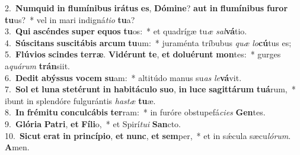 {2.~}\textbf{Num}\textbf{quid} \textbf{in} \textbf{flu}\textbf{mí}\textbf{ni}\textbf{bus} \textbf{i}\textbf{rá}\textbf{tus} \textbf{es}, \textbf{Dó}\textbf{mi}\textbf{ne}? \textbf{aut} \textbf{in} \textbf{flu}\textbf{mí}\textbf{ni}\textbf{bus} \textbf{fu}\textbf{ror} \textbf{tu}us?~* vel in mari indigná\textit{ti}\textit{o} \textbf{tu}a?\\
{3.~}\textbf{Qui} \textbf{a}\textbf{scén}\textbf{des} \textbf{su}\textbf{per} \textbf{e}\textbf{quos} \textbf{tu}os:~* et quadrígæ tu\textit{æ} \textit{sal}\textbf{vá}tio.\\
{4.~}\textbf{Sú}\textbf{sci}\textbf{tans} \textbf{su}\textbf{sci}\textbf{tá}\textbf{bis} \textbf{ar}\textbf{cum} \textbf{tu}um:~* juraménta tríbubus \textit{quæ} \textit{lo}\textbf{cú}tus es;\\
{5.~}\textbf{Flú}\textbf{vi}\textbf{os} \textbf{scin}\textbf{des} \textbf{ter}\textbf{ræ}. \textbf{Vi}\textbf{dé}\textbf{runt} \textbf{te}, \textbf{et} \textbf{do}\textbf{lu}\textbf{é}\textbf{runt} \textbf{mon}tes:~* gurges a\textit{quá}\textit{rum} \textbf{trán}siit.\\
{6.~}\textbf{De}\textbf{dit} \textbf{a}\textbf{býs}\textbf{sus} \textbf{vo}\textbf{cem} \textbf{su}am:~* altitúdo manus su\textit{as} \textit{le}\textbf{vá}vit.\\
{7.~}\textbf{Sol} \textbf{et} \textbf{lu}\textbf{na} \textbf{ste}\textbf{té}\textbf{runt} \textbf{in} \textbf{ha}\textbf{bi}\textbf{tá}\textbf{cu}\textbf{lo} \textbf{su}\textbf{o}, \textbf{in} \textbf{lu}\textbf{ce} \textbf{sa}\textbf{git}\textbf{tá}\textbf{rum} \textbf{tu}\textbf{á}rum,~* ibunt in splendóre fulgurántis \textit{ha}\textit{stæ} \textbf{tu}æ.\\
{8.~}\textbf{In} \textbf{fré}\textbf{mi}\textbf{tu} \textbf{con}\textbf{cul}\textbf{cá}\textbf{bis} \textbf{ter}ram:~* in furóre obstupefá\textit{ci}\textit{es} \textbf{Gen}tes.\\
{9.~}\textbf{Gló}\textbf{ri}\textbf{a} \textbf{Pa}\textbf{tri}, \textbf{et} \textbf{Fí}\textbf{li}o,~* et Spirí\textit{tu}\textit{i} \textbf{San}cto.\\
{10.~}\textbf{Si}\textbf{cut} \textbf{e}\textbf{rat} \textbf{in} \textbf{prin}\textbf{cí}\textbf{pi}\textbf{o}, \textbf{et} \textbf{nunc}, \textbf{et} \textbf{sem}per,~* et in sǽcula sæcu\textit{ló}\textit{rum}. \textbf{A}men.\\
